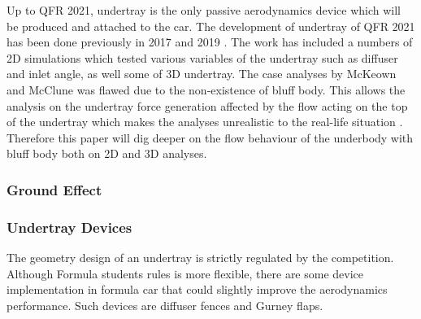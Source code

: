 \noindent Up to QFR 2021, undertray is the only passive aerodynamics device which will be produced and attached to the car. The development of undertray of QFR 2021 has been done previously in 2017 \cite{McKeown2018DesignCar} and 2019 \cite{McClune2018DesignCar}. The work has included a numbers of 2D simulations which tested various variables of the undertray such as diffuser and inlet angle, as well some of 3D undertray. The case analyses by McKeown \cite{McKeown2018DesignCar} and McClune \cite{McClune2018DesignCar} was flawed due to the non-existence of bluff body. This allows the analysis on the undertray force generation affected by the flow acting on the top of the undertray which makes the analyses unrealistic to the real-life situation \cite{Corr2017MechanicalAuthor}. Therefore this paper will dig deeper on the flow behaviour of the underbody with bluff body both on 2D and 3D analyses. 

\subsubsection{Ground Effect}


\subsubsection{Undertray Devices}
The geometry design of an undertray is strictly regulated by the competition. Although Formula students rules is more flexible, there are some device implementation in formula car that could slightly improve the aerodynamics performance. Such devices are diffuser fences and Gurney flaps.


